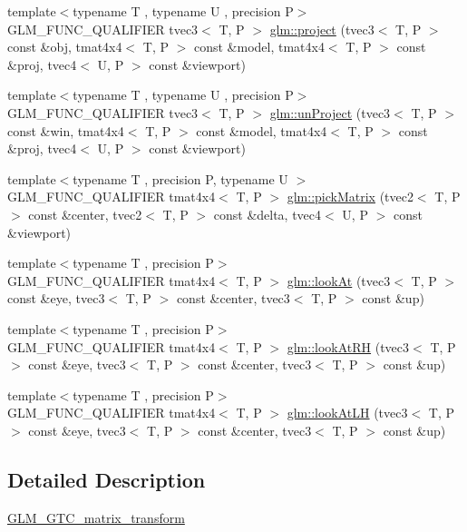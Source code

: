 \begin{DoxyCompactItemize}
\item 
{\footnotesize template$<$typename T , typename U , precision P$>$ }\\G\+L\+M\+\_\+\+F\+U\+N\+C\+\_\+\+Q\+U\+A\+L\+I\+F\+I\+ER tvec3$<$ T, P $>$ \hyperlink{group__gtc__matrix__transform_gad743556abd138264d4f06f4ca27f1d7e}{glm\+::project} (tvec3$<$ T, P $>$ const \&obj, tmat4x4$<$ T, P $>$ const \&model, tmat4x4$<$ T, P $>$ const \&proj, tvec4$<$ U, P $>$ const \&viewport)
\item 
{\footnotesize template$<$typename T , typename U , precision P$>$ }\\G\+L\+M\+\_\+\+F\+U\+N\+C\+\_\+\+Q\+U\+A\+L\+I\+F\+I\+ER tvec3$<$ T, P $>$ \hyperlink{group__gtc__matrix__transform_ga82a558de3ce42cbeed0f6ec292a4e1b3}{glm\+::un\+Project} (tvec3$<$ T, P $>$ const \&win, tmat4x4$<$ T, P $>$ const \&model, tmat4x4$<$ T, P $>$ const \&proj, tvec4$<$ U, P $>$ const \&viewport)
\item 
{\footnotesize template$<$typename T , precision P, typename U $>$ }\\G\+L\+M\+\_\+\+F\+U\+N\+C\+\_\+\+Q\+U\+A\+L\+I\+F\+I\+ER tmat4x4$<$ T, P $>$ \hyperlink{group__gtc__matrix__transform_ga9026c77505b99990f68826f27c267dc5}{glm\+::pick\+Matrix} (tvec2$<$ T, P $>$ const \&center, tvec2$<$ T, P $>$ const \&delta, tvec4$<$ U, P $>$ const \&viewport)
\item 
{\footnotesize template$<$typename T , precision P$>$ }\\G\+L\+M\+\_\+\+F\+U\+N\+C\+\_\+\+Q\+U\+A\+L\+I\+F\+I\+ER tmat4x4$<$ T, P $>$ \hyperlink{group__gtc__matrix__transform_gaf8eef81da1ad09f6a8920101c01eaae4}{glm\+::look\+At} (tvec3$<$ T, P $>$ const \&eye, tvec3$<$ T, P $>$ const \&center, tvec3$<$ T, P $>$ const \&up)
\item 
{\footnotesize template$<$typename T , precision P$>$ }\\G\+L\+M\+\_\+\+F\+U\+N\+C\+\_\+\+Q\+U\+A\+L\+I\+F\+I\+ER tmat4x4$<$ T, P $>$ \hyperlink{group__gtc__matrix__transform_ga2876d9313334980b94292d2ec169088e}{glm\+::look\+At\+RH} (tvec3$<$ T, P $>$ const \&eye, tvec3$<$ T, P $>$ const \&center, tvec3$<$ T, P $>$ const \&up)
\item 
{\footnotesize template$<$typename T , precision P$>$ }\\G\+L\+M\+\_\+\+F\+U\+N\+C\+\_\+\+Q\+U\+A\+L\+I\+F\+I\+ER tmat4x4$<$ T, P $>$ \hyperlink{group__gtc__matrix__transform_gacd0c077ec7b58a575855e29cb5fb586d}{glm\+::look\+At\+LH} (tvec3$<$ T, P $>$ const \&eye, tvec3$<$ T, P $>$ const \&center, tvec3$<$ T, P $>$ const \&up)
\end{DoxyCompactItemize}


\subsection{Detailed Description}
\hyperlink{group__gtc__matrix__transform}{G\+L\+M\+\_\+\+G\+T\+C\+\_\+matrix\+\_\+transform} 